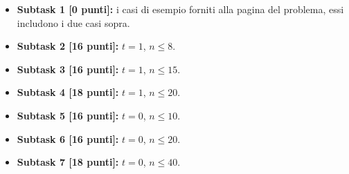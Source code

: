   \begin{itemize}
    \item \textbf{Subtask 1 [0 punti]:} i casi di esempio forniti alla pagina del problema, essi includono i due casi sopra.
    \item \textbf{Subtask 2 [16 punti]:} $t=1$, $n \le 8$.
    \item \textbf{Subtask 3 [16 punti]:} $t=1$, $n \le 15$.
    \item \textbf{Subtask 4 [18 punti]:} $t=1$, $n \le 20$.
    \item \textbf{Subtask 5 [16 punti]:} $t=0$, $n \le 10$.
    \item \textbf{Subtask 6 [16 punti]:} $t=0$, $n \le 20$.
    \item \textbf{Subtask 7 [18 punti]:} $t=0$, $n \le 40$.
  \end{itemize}
  
